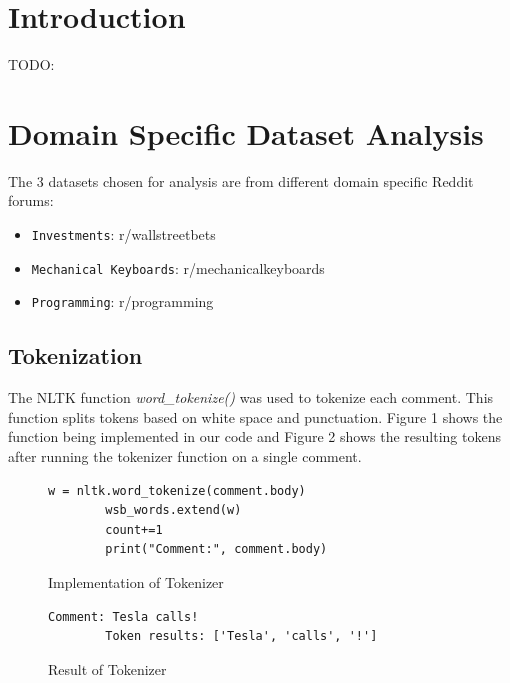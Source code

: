 \documentclass[sigconf,nonacm=true]{acmart}
\begin{document}
\maketitle

\section{Introduction}
TODO:

\section{Domain Specific Dataset Analysis}
The 3 datasets chosen for analysis are from different domain specific Reddit forums:
\begin{itemize}
	\item {\verb|Investments|}: r/wallstreetbets
	\item {\verb|Mechanical Keyboards|}: r/mechanicalkeyboards
	\item {\verb|Programming|}: r/programming
\end{itemize}

\subsection{Tokenization} 
The NLTK function \textit{word\_tokenize()} was used to tokenize each comment. This function splits tokens based on white space and punctuation. Figure 1 shows the function being implemented in our code and Figure 2 shows the resulting tokens after running the tokenizer function on a single comment. \bigskip

\renewcommand{\lstlistingname}{Figure}%
\renewcommand{\lstlistlistingname}{List of \lstlistingname s}%

\begin{figure}[H]
	\begin{lstlisting}[gobble=10]
	    w = nltk.word_tokenize(comment.body)
	    wsb_words.extend(w)
	    count+=1
	    print("Comment:", comment.body)
	\end{lstlisting}
	\caption{Implementation of Tokenizer}
\end{figure}

\begin{figure}[H]
	\begin{lstlisting}[gobble=10]
	    Comment: Tesla calls!
	    Token results: ['Tesla', 'calls', '!']
	\end{lstlisting}
	\caption{Result of Tokenizer}
\end{figure}
\end{document}
